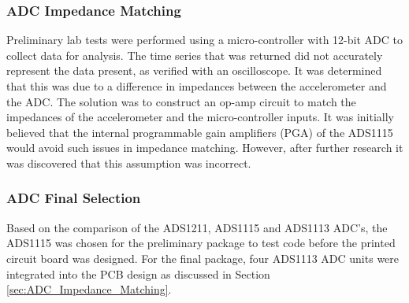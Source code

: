 \subsubsection{ADC Impedance Matching}
Preliminary lab tests were performed using a micro-controller with 12-bit ADC to collect data for analysis.
The time series that was returned did not accurately represent the data present, as verified with an oscilloscope.
It was determined that this was due to a difference in impedances between the accelerometer and the ADC.
The solution was to construct an op-amp circuit to match the impedances of the accelerometer and the micro-controller inputs.
It was initially believed that the internal programmable gain amplifiers (PGA) of the ADS1115 would avoid such issues in impedance matching.
However, after further research it was discovered that this assumption was incorrect.


\subsubsection{ADC Final Selection}
\indent Based on the comparison of the ADS1211, ADS1115 and ADS1113 ADC's, the ADS1115 was chosen for the preliminary package to test code before the printed circuit board was designed.
For the final package, four ADS1113 ADC units were integrated into the PCB design as discussed in Section \ref{sec:ADC_Impedance_Matching}. 
